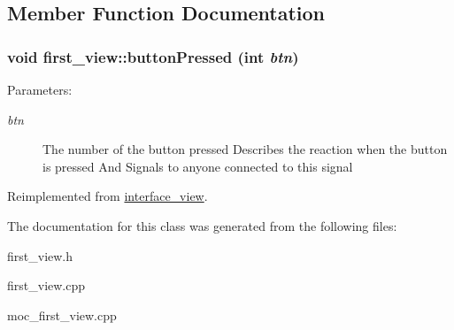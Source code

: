 \subsection{Member Function Documentation}
\hypertarget{classfirst__view_7b6e2b02361b8b92526de0e32ac987a3}{
\subsubsection[{buttonPressed}]{\setlength{\rightskip}{0pt plus 5cm}void first\_\-view::buttonPressed (int {\em btn})}}
\label{classfirst__view_7b6e2b02361b8b92526de0e32ac987a3}


\begin{Desc}
\item[Parameters:]
\begin{description}
\item[{\em btn}]The number of the button pressed Describes the reaction when the button is pressed And Signals to anyone connected to this signal \end{description}
\end{Desc}


Reimplemented from \hyperlink{classinterface__view_2cbfdb9bdf8d47fd9a381df0bc67f434}{interface\_\-view}.

The documentation for this class was generated from the following files:\begin{CompactItemize}
\item 
first\_\-view.h\item 
first\_\-view.cpp\item 
moc\_\-first\_\-view.cpp\end{CompactItemize}
